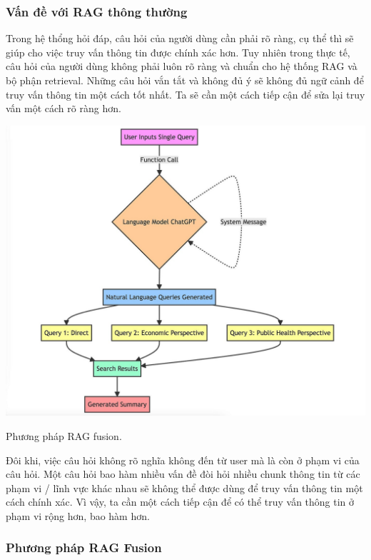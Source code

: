\documentclass[a4paper, 12pt, openany]{book}
\begin{document}
\subsubsection{Vấn đề với RAG thông thường}

Trong hệ thổng hỏi đáp, câu hỏi của người dùng cần phải rõ ràng, cụ thể thì sẽ giúp cho việc truy vấn thông tin được chính xác hơn.
Tuy nhiên trong thực tế, câu hỏi của người dùng không phải luôn rõ ràng và chuẩn cho hệ thống RAG và bộ phận retrieval. Những câu hỏi vắn tắt
và không đủ ý sẽ không đủ ngữ cảnh để truy vấn thông tin một cách tốt nhất. Ta sẽ cần một cách tiếp cận để sửa lại truy vấn một cách rõ ràng hơn.

\begin{minipage}{\linewidth}
    \centering
    \includegraphics[width=.9\linewidth]{./assets/images/rag_fusion.jpg}
    \captionsetup{type=figure}
    \caption{Phương pháp RAG fusion.}
\end{minipage}
\vspace{0.5cm}

Đôi khi, việc câu hỏi không rõ nghĩa không đến từ user mà là còn ở phạm vi của câu hỏi.
Một câu hỏi bao hàm nhiều vấn đề đòi hỏi nhiều chunk thông tin từ các phạm vi / lĩnh vực khác nhau
sẽ không thể được dùng để truy vấn thông tin một cách chính xác. Vì vậy, ta cần một cách tiếp cận
để có thể truy vấn thông tin ở phạm vi rộng hơn, bao hàm hơn.

\subsubsection{Phương pháp RAG Fusion}
\end{document}
